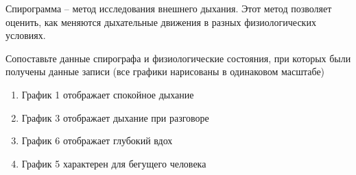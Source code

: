 
Спирограмма – метод исследования внешнего дыхания. Этот
метод позволяет оценить, как меняются дыхательные движения в разных
физиологических условиях.


Сопоставьте данные спирографа и физиологические состояния,
при которых были получены данные записи (все графики нарисованы в одинаковом
масштабе)

\begin{enumerate}
    \item График 1 отображает спокойное дыхание
    \item График 3 отображает дыхание при разговоре
    \item График 6 отображает глубокий вдох
    \item График 5 характерен для бегущего человека
\end{enumerate}

\explanationSection

